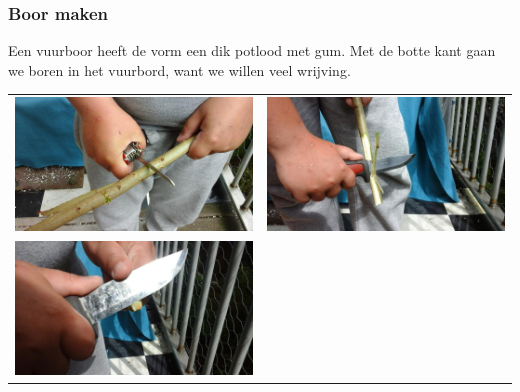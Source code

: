 \documentclass[a4paper, handout]{beamer}
\begin{document}
\begin{frame}
	\frametitle{Boor maken}
	Een vuurboor heeft de vorm een dik potlood met gum. Met de botte kant gaan we boren in het vuurbord, want we willen veel wrijving.

	\begin{tabular}{ c c }
		\includegraphics[scale=0.14]{boor-maken-1}
		&
		\includegraphics[scale=0.14]{boor-maken-2}
		\\
		\includegraphics[scale=0.14]{boor-maken-3}

\end{tabular}
\end{frame}
\end{document}
